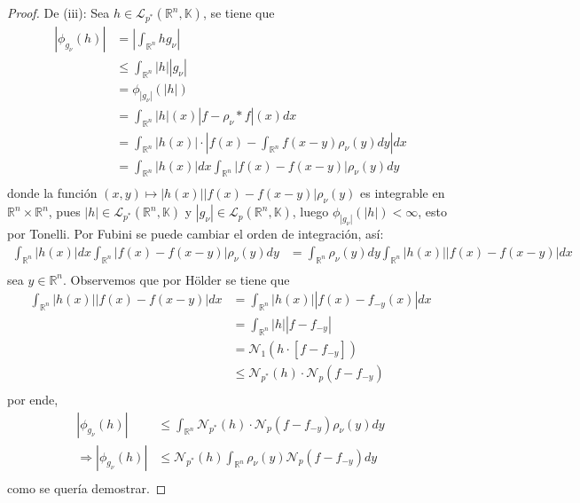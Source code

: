 \documentclass[12pt]{report}
\newcounter{it}
\theoremstyle{largebreak}
\newcommand\abs[1]{\ensuremath{\left|#1\right|}}
\newcommand{\N}[2]{\ensuremath{\mathcal{N}_{#1}\left(#2\right)}}
\begin{document}
\begin{proof}
        De (iii): Sea $h\in\mathcal{L}_{p^*}(\mathbb{R}^n,\mathbb{K})$, se tiene que
        \begin{equation*}
            \begin{split}
                \abs{\phi_{ g_\nu}(h)}&=\abs{\int_{ \mathbb{R}^n}hg_\nu }\\
                &\leq\int_{ \mathbb{R}^n}\abs{h}\abs{g_\nu}\\
                &=\phi_{\abs{g_\nu}}(\abs{h})\\
                &=\int_{ \mathbb{R}^n}\abs{h}(x)\abs{f-\rho_\nu*f}(x)dx\\
                &=\int_{ \mathbb{R}^n}\abs{h(x)}\cdot\abs{f(x)-\int_{\mathbb{R}^n}f(x-y)\rho_\nu(y)dy}dx\\
                &=\int_{ \mathbb{R}^n}\abs{h(x)}dx\int_{\mathbb{R}^n}\abs{f(x)-f(x-y)}\rho_\nu(y)dy\\
            \end{split}
        \end{equation*}
        donde la función $(x,y)\mapsto\abs{h(x)}\abs{f(x)-f(x-y)}\rho_\nu(y)$ es integrable en $\mathbb{R}^n\times\mathbb{R}^n$, pues $\abs{h}\in\mathcal{L}_{ p^*}(\mathbb{R}^n,\mathbb{K})$ y $\abs{g_\nu}\in\mathcal{L}_{p}(\mathbb{R}^n,\mathbb{K})$, luego $\phi_{\abs{g_\nu}}(\abs{h})<\infty$, esto por Tonelli. Por Fubini se puede cambiar el orden de integración, así:
        \begin{equation*}
            \begin{split}
                \int_{ \mathbb{R}^n}\abs{h(x)}dx\int_{\mathbb{R}^n}\abs{f(x)-f(x-y)}\rho_\nu(y)dy&=\int_{ \mathbb{R}^n}\rho_\nu(y)dy\int_{\mathbb{R}^n}\abs{h(x)}\abs{f(x)-f(x-y)}dx \\
            \end{split}
        \end{equation*}
        sea $y\in\mathbb{R}^n$. Observemos que por Hölder se tiene que
        \begin{equation*}
            \begin{split}
                \int_{\mathbb{R}^n}\abs{h(x)}\abs{f(x)-f(x-y)}dx&=\int_{\mathbb{R}^n}\abs{h(x)}\abs{f(x)-f_{-y}(x)}dx\\
                &=\int_{\mathbb{R}^n}\abs{h}\abs{f-f_{-y}}\\
                &=\N{1}{h\cdot\left[f-f_{-y}\right]}\\
                &\leq\N{p^*}{h}\cdot\N{p}{f-f_{-y}}\\
            \end{split}
        \end{equation*}
        por ende,
        \begin{equation*}
            \begin{split}
                \abs{\phi_{ g_\nu}(h)}&\leq\int_{\mathbb{R}^n}\N{p^*}{h}\cdot\N{p}{f-f_{-y}}\rho_\nu(y)dy\\
                \Rightarrow\abs{\phi_{ g_\nu}(h)}&\leq\N{p^*}{h}\int_{\mathbb{R}^n}\rho_\nu(y)\N{p}{f-f_{-y}}dy\\
            \end{split}
        \end{equation*}
        como se quería demostrar.


\end{proof}
\end{document}
